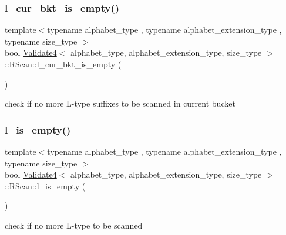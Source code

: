\subsubsection{\texorpdfstring{l\+\_\+cur\+\_\+bkt\+\_\+is\+\_\+empty()}{l\_cur\_bkt\_is\_empty()}}
{\footnotesize\ttfamily template$<$typename alphabet\+\_\+type , typename alphabet\+\_\+extension\+\_\+type , typename size\+\_\+type $>$ \\
bool \hyperlink{class_validate4}{Validate4}$<$ alphabet\+\_\+type, alphabet\+\_\+extension\+\_\+type, size\+\_\+type $>$\+::R\+Scan\+::l\+\_\+cur\+\_\+bkt\+\_\+is\+\_\+empty (\begin{DoxyParamCaption}{ }\end{DoxyParamCaption})\hspace{0.3cm}{\ttfamily [inline]}}



check if no more L-\/type suffixes to be scanned in current bucket 

\mbox{\label{struct_validate4_1_1_r_scan_aee1dcbd2edf03def6f3b3954d5cf0871}} 
\subsubsection{\texorpdfstring{l\+\_\+is\+\_\+empty()}{l\_is\_empty()}}
{\footnotesize\ttfamily template$<$typename alphabet\+\_\+type , typename alphabet\+\_\+extension\+\_\+type , typename size\+\_\+type $>$ \\
bool \hyperlink{class_validate4}{Validate4}$<$ alphabet\+\_\+type, alphabet\+\_\+extension\+\_\+type, size\+\_\+type $>$\+::R\+Scan\+::l\+\_\+is\+\_\+empty (\begin{DoxyParamCaption}{ }\end{DoxyParamCaption})\hspace{0.3cm}{\ttfamily [inline]}}



check if no more L-\/type to be scanned 

\mbox{\label{struct_validate4_1_1_r_scan_a67647b0b0ef9df76bdcfa85547296a33}} 
